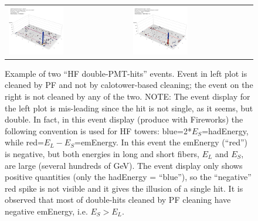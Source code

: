 %
\begin{figure}[h]
 \centering
 \begin{tabular}{ll}
   \includegraphics[width=0.47\textwidth]{fig/HFdoubleHit.png} &
   \includegraphics[width=0.47\textwidth]{fig/HFdoubleHit_1.png} \\
 \end{tabular}
\caption{Example of two ``HF double-PMT-hits'' events. Event in left plot is cleaned by PF and not by 
calotower-based cleaning; the event on the right is not cleaned by any of the two. 
NOTE: The event display for the left plot is mis-leading since the hit is not single, 
as it seems, but double. In fact, in this event display (produce with Fireworks) 
the following convention is used for HF towers: blue=2*$E_{S}$=hadEnergy, while red=$E_{L}-E_{S}$=emEnergy. 
In this event the emEnergy (``red'') is negative, but both energies in long and short fibers, $E_{L}$ and $E_{S}$, are large
(several hundreds of GeV). The event display only shows positive quantities 
(only the hadEnergy = ``blue''), so the ``negative'' red spike is not visible and it gives the illusion of a single hit. 
It is observed that most of double-hits cleaned by PF cleaning have negative emEnergy, i.e. $E_S>E_L$.}
\label{fig:HFdoublehits}
\end{figure}

